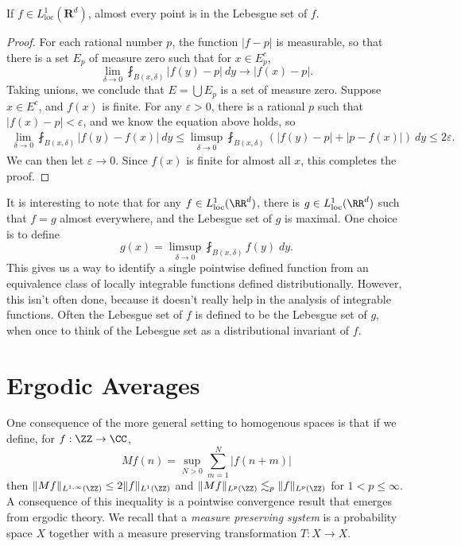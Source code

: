 \begin{theorem}
    If $f \in L^1_{\text{loc}}(\mathbf{R}^d)$, almost every point is in the Lebesgue set of $f$.
\end{theorem}
\begin{proof}
    For each rational number $p$, the function $|f - p|$ is measurable, so that there is a set $E_p$ of measure zero such that for $x \in E_p^c$,
    \[ \lim_{\delta \to 0} \fint_{B(x,\delta)} |f(y) - p|\ dy \to |f(x) - p|. \]
    Taking unions, we conclude that $E = \bigcup E_p$ is a set of measure zero. Suppose $x \in E^c$, and $f(x)$ is finite. For any $\varepsilon > 0$, there is a rational $p$ such that $|f(x) - p| < \varepsilon$, and we know the equation above holds, so
    \begin{align*}
        \lim_{\delta \to 0} \fint_{B(x,\delta)} |f(y) - f(x)|\ dy \leq \limsup_{\delta \to 0} \fint_{B(x,\delta)} \left( |f(y) - p| + |p - f(x)| \right)\ dy \leq 2\varepsilon.
    \end{align*}
    We can then let $\varepsilon \to 0$. Since $f(x)$ is finite for almost all $x$, this completes the proof.
\end{proof}

It is interesting to note that for any $f \in L^1_{\text{loc}}(\RR^d)$, there is $g \in L^1_{\text{loc}}(\RR^d)$ such that $f = g$ almost everywhere, and the Lebesgue set of $g$ is maximal. One choice is to define
%
\[ g(x) = \limsup_{\delta \to 0} \fint_{B(x,\delta)} f(y)\; dy. \]
%
This gives us a way to identify a single pointwise defined function from an equivalence class of locally integrable functions defined distributionally. However, this isn't often done, because it doesn't really help in the analysis of integrable functions. Often the Lebesgue set of $f$ is defined to be the Lebesgue set of $g$, when once to think of the Lebesgue set as a distributional invariant of $f$.

\section{Ergodic Averages}

One consequence of the more general setting to homogenous spaces is that if we define, for $f : \ZZ \to \CC$,
%
\[ Mf(n) = \sup_{N > 0} \sum_{m = 1}^N |f(n + m)| \]
%
then $\| Mf \|_{L^{1,\infty}(\ZZ)} \leq 2 \| f \|_{L^1(\ZZ)}$ and $\| Mf \|_{L^p(\ZZ)} \lesssim_p \| f \|_{L^p(\ZZ)}$ for $1 < p \leq \infty$. A consequence of this inequality is a pointwise convergence result that emerges from ergodic theory. We recall that a \emph{measure preserving system} is a probability space $X$ together with a measure preserving transformation $T: X \to X$.

